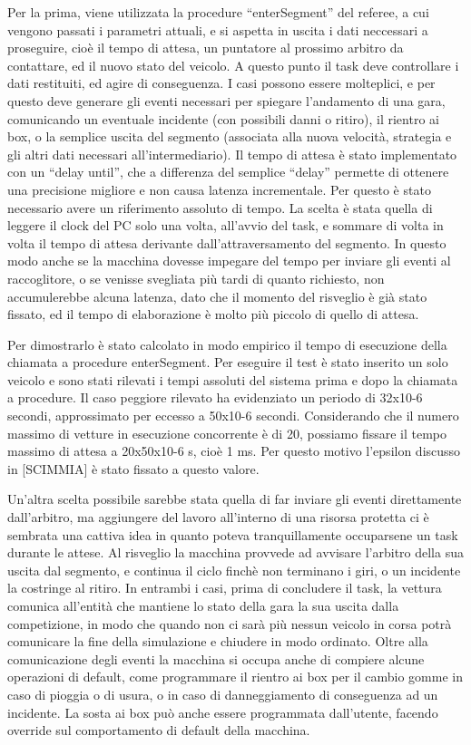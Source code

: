 Per la prima, viene utilizzata la procedure “enterSegment” del referee, a cui vengono passati i parametri attuali, e si aspetta in uscita i dati neccessari a proseguire, cioè il tempo di attesa, un puntatore al prossimo arbitro da contattare, ed il nuovo stato del veicolo.
A questo punto il task deve controllare i dati restituiti, ed agire di conseguenza. I casi possono essere molteplici, e per questo deve generare gli eventi necessari per spiegare l’andamento di una gara, comunicando un eventuale incidente (con possibili danni o ritiro), il rientro ai box, o la semplice uscita del segmento (associata alla nuova velocità, strategia e gli altri dati necessari all’intermediario).
Il tempo di attesa è stato implementato con un “delay until”, che a differenza del semplice “delay” permette di ottenere una precisione migliore e non causa latenza incrementale. Per questo è stato necessario avere un riferimento assoluto di tempo. La scelta è stata quella di leggere il clock del PC solo una volta, all’avvio del task, e sommare di volta in volta il tempo di attesa derivante dall’attraversamento del segmento.
In questo modo anche se la macchina dovesse impegare del tempo per inviare gli eventi al raccoglitore, o se venisse svegliata più tardi di quanto richiesto, non accumulerebbe alcuna latenza, dato che il momento del risveglio è già stato fissato, ed il tempo di elaborazione è molto più piccolo di quello di attesa.

Per dimostrarlo è stato calcolato in modo empirico il tempo di esecuzione della chiamata a procedure enterSegment. Per eseguire il test è stato inserito un solo veicolo e sono stati rilevati i tempi assoluti del sistema prima e dopo la chiamata a procedure. Il caso peggiore rilevato ha evidenziato un periodo di 32x10-6 secondi, approssimato per eccesso a 50x10-6 secondi. Considerando che il numero massimo di vetture in esecuzione concorrente è di 20, possiamo fissare il tempo massimo di attesa a 20x50x10-6 s, cioè 1 ms. Per questo motivo l'epsilon discusso in [SCIMMIA] è stato fissato a questo valore.

Un’altra scelta possibile sarebbe stata quella di far inviare gli eventi direttamente dall’arbitro, ma aggiungere del lavoro all’interno di una risorsa protetta ci è sembrata una cattiva idea in quanto poteva tranquillamente occuparsene un task durante le attese.
Al risveglio la macchina provvede ad avvisare l’arbitro della sua uscita dal segmento, e continua il ciclo finchè non terminano i giri, o un incidente la costringe al ritiro. In entrambi i casi, prima di concludere il task, la vettura comunica all’entità che mantiene lo stato della gara la sua uscita dalla competizione, in modo che quando non ci sarà più nessun veicolo in corsa potrà comunicare la fine della simulazione e chiudere in modo ordinato.
Oltre alla comunicazione degli eventi la macchina si occupa anche di compiere alcune operazioni di default, come programmare il rientro ai box per il cambio gomme in caso di pioggia o di usura, o in caso di danneggiamento di conseguenza ad un incidente. La sosta ai box può anche essere programmata dall’utente, facendo override sul comportamento di default della macchina.

